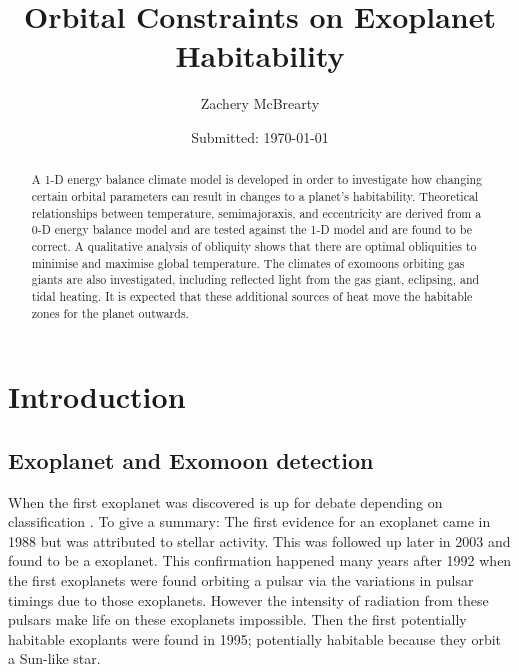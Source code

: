 \documentclass[12pt, onecolumn]{revtex4-2}    %
\begin{document}
\title{Orbital Constraints on Exoplanet Habitability}
\date{Submitted: \today{}}
\author{Zachery McBrearty}

\begin{abstract}
  A 1-D energy balance climate model is developed in order to investigate how changing certain orbital parameters can result in changes to a planet's habitability.
  Theoretical relationships between temperature, semimajoraxis, and eccentricity are derived from a 0-D energy balance model and are tested against the 1-D model and are found to be correct.
  A qualitative analysis of obliquity shows that there are optimal obliquities to minimise and maximise global temperature.
  The climates of exomoons orbiting gas giants are also investigated, including reflected light from the gas giant, eclipsing, and tidal heating.
  It is expected that these additional sources of heat move the habitable zones for the planet outwards.
\end{abstract}


\maketitle

\newpage

\tableofcontents

\newpage


\section{Introduction} \label{sec:Introduction} %
%
\subsection{Exoplanet and Exomoon detection} \label{ssec:ExoplanetExomoonDetection}
%
When the first exoplanet was discovered is up for debate depending on classification \cite{ESA_2019}.
To give a summary:
The first evidence for an exoplanet came in 1988 but was attributed to stellar activity.
This was followed up later in 2003 and found to be a exoplanet.
This confirmation happened many years after 1992 when the first exoplanets were found orbiting a pulsar via the variations in pulsar timings due to those exoplanets.
However the intensity of radiation from these pulsars make life on these exoplanets impossible.
Then the first potentially habitable exoplants were found in 1995; potentially habitable because they orbit a Sun-like star.
\end{document}
